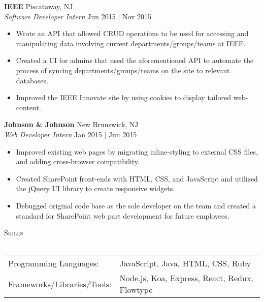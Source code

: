 \documentclass[a4paper]{article}
\newcommand{\lineunder} {
    \vspace*{-8pt} \\
    \hspace*{-18pt} \hrulefill \\
}
\newcommand{\header} [1] {
    {\hspace*{-18pt}\vspace*{6pt} \textsc{#1}}
    \vspace*{-6pt} \lineunder
}
\begin{document}
\textbf{IEEE} \hfill Piscataway, NJ\\
\textit{Software Developer Intern} \hfill Jun 2015 | Nov 2015\\
\vspace{-1mm}
\begin{itemize} \itemsep 1pt
	\item Wrote an API that allowed CRUD operations to be used for accessing and manipulating data involving current departments/groups/teams at IEEE.
	\item Created a UI for admins that used the aforementioned API to automate the process of syncing departments/groups/teams on the site to relevant databases.
	\item Improved the IEEE Innovate site by using cookies to display tailored web-content.
\end{itemize}

\textbf{Johnson \& Johnson} \hfill New Brunswick, NJ\\
\textit{Web Developer Intern} \hfill Jan 2015 | Jun 2015\\
\vspace{-1mm}
\begin{itemize} \itemsep 1pt
	\item Improved existing web pages by migrating inline-styling to external CSS files, and adding cross-browser compatibility.
	\item Created SharePoint front-ends with HTML, CSS, and JavaScript and utilized the jQuery UI library to create responsive widgets.
	\item Debugged original code base as the sole developer on the team and created a standard for SharePoint web part development for future employees.
\end{itemize}

\header{Skills}
\begin{tabular}{ l l }
	Programming Languages:      & JavaScript, Java, HTML, CSS, Ruby             \\
	Frameworks/Libraries/Tools: & Node.js, Koa, Express, React, Redux, Flowtype \\
\end{tabular}

\vspace*{2mm}
\end{document}
